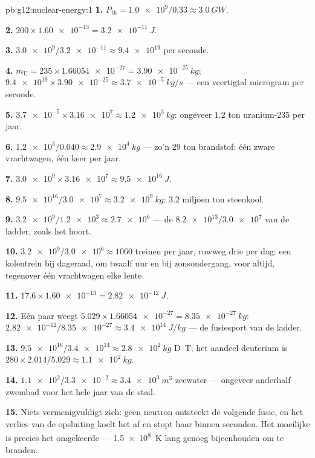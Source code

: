 \begin{solution}{pb:g12:nuclear-energy:1}
\textbf{1.} $P_{\text{th}} = \num{1.0e9}/0.33 \approx \qty{3.0}{GW}$.

\textbf{2.} $200 \times \num{1.60e-13} = \qty{3.2e-11}{J}$.

\textbf{3.} $\num{3.0e9}/\num{3.2e-11} \approx \num{9.4e19}$
 per seconde.

\textbf{4.} $m_{\mathrm U} = 235 \times \num{1.66054e-27} =
\qty{3.90e-25}{kg}$; $\num{9.4e19} \times \num{3.90e-25} \approx
\qty{3.7e-5}{kg/s}$ --- een veertigtal microgram per seconde.

\textbf{5.} $\num{3.7e-5} \times \num{3.16e7} \approx \qty{1.2e3}{kg}$:
ongeveer $1.2$ ton uranium-235 per jaar.

\textbf{6.} $\num{1.2e3}/0.040 \approx \qty{2.9e4}{kg}$ --- zo'n $29$ ton
brandstof: één zware vrachtwagen, één keer per jaar.

\textbf{7.} $\num{3.0e9} \times \num{3.16e7} \approx \qty{9.5e16}{J}$.

\textbf{8.} $\num{9.5e16}/\num{3.0e7} \approx \qty{3.2e9}{kg}$: $3.2$ miljoen
ton steenkool.

\textbf{9.} $\num{3.2e9}/\num{1.2e3} \approx \num{2.7e6}$ --- de
$\num{8.2e13}/\num{3.0e7}$ van de ladder, zoals het hoort.

\textbf{10.} $\num{3.2e9}/\num{3.0e6} \approx 1060$ treinen per jaar, ruwweg
drie per dag: een kolentrein bij dageraad, om twaalf uur en bij zonsondergang,
voor altijd, tegenover één vrachtwagen elke lente.

\textbf{11.} $17.6 \times \num{1.60e-13} = \qty{2.82e-12}{J}$.

\textbf{12.} Eén paar weegt $5.029 \times \num{1.66054e-27} =
\qty{8.35e-27}{kg}$: $\num{2.82e-12}/\num{8.35e-27} \approx
\qty{3.4e14}{J/kg}$ --- de fusiesport van de ladder.

\textbf{13.} $\num{9.5e16}/\num{3.4e14} \approx \qty{2.8e2}{kg}$ D--T; het
aandeel deuterium is $280 \times 2.014/5.029 \approx \qty{1.1e2}{kg}$.

\textbf{14.} $\num{1.1e2}/\num{3.3e-2} \approx \qty{3.4e3}{m^3}$ zeewater ---
ongeveer anderhalf zwembad voor het hele jaar van de stad.

\textbf{15.} Niets vermenigvuldigt zich: geen neutron ontsteekt de volgende
fusie, en het verlies van de opsluiting koelt het  af en stopt haar
binnen seconden. Het moeilijke is precies het omgekeerde --- \qty{1.5e8}{K}
lang genoeg bijeenhouden om te branden.


\end{solution}
